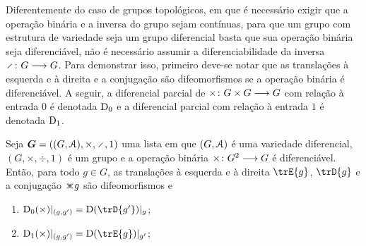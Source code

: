 Diferentemente do caso de grupos topológicos, em que é necessário exigir que a operação binária e a inversa do grupo sejam contínuas, para que um grupo com estrutura de variedade seja um grupo diferencial basta que sua operação binária seja diferenciável, não é necessário assumir a diferenciabilidade da inversa $\fun{\div}{G}{G}$. Para demonstrar isso, primeiro deve-se notar que as translações à esquerda e à direita e a conjugação são difeomorfismos se a operação binária é diferenciável. A seguir, a diferencial parcial de ${\times}\colon {G \times G} \longrightarrow {G}$ com relação à entrada $0$ é denotada $\mathrm{D}_0$ e a diferencial parcial com relação à entrada $1$ é denotada $\mathrm{D}_1$.

\begin{exercise}
Seja $\bm G = ((G,\atlas),\times,\div,1)$ uma lista em que $(G,\mathcal{A})$ é uma variedade diferencial, $(G,\times,\div,1)$ é um grupo e a operação binária ${\times}\colon {G^2} \longrightarrow {G}$ é diferenciável. Então, para todo $g \in G$, as translações à esquerda e à direita $\trE{g}$, $\trD{g}$ e a conjugação $\con{g}$ são difeomorfismos e
	\begin{enumerate}
	\item $\D_0(\times)|_{(g,g')} = \D (\trD{g'})|_{g}$;
	\item $\D_1(\times)|_{(g,g')} = \D (\trE{g})|_{g'}$;
	\end{enumerate}
\end{exercise}


